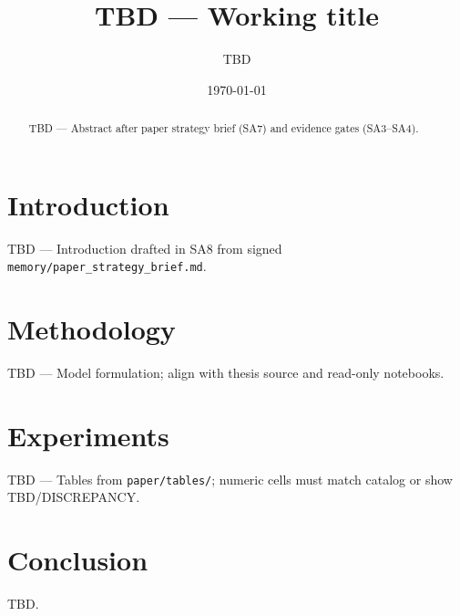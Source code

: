 \documentclass{article}
\title{TBD --- Working title}
\author{TBD}
\date{\today}
\begin{document}
\maketitle

\begin{abstract}
TBD --- Abstract after paper strategy brief (SA7) and evidence gates (SA3--SA4).
\end{abstract}

\section{Introduction}
\label{sec:intro}

TBD --- Introduction drafted in SA8 from signed \texttt{memory/paper\_strategy\_brief.md}.

\section{Methodology}
\label{sec:method}

TBD --- Model formulation; align with thesis source and read-only notebooks.

\section{Experiments}
\label{sec:experiments}

TBD --- Tables from \texttt{paper/tables/}; numeric cells must match catalog or show TBD/DISCREPANCY.

\section{Conclusion}
\label{sec:conclusion}

TBD.



\end{document}

